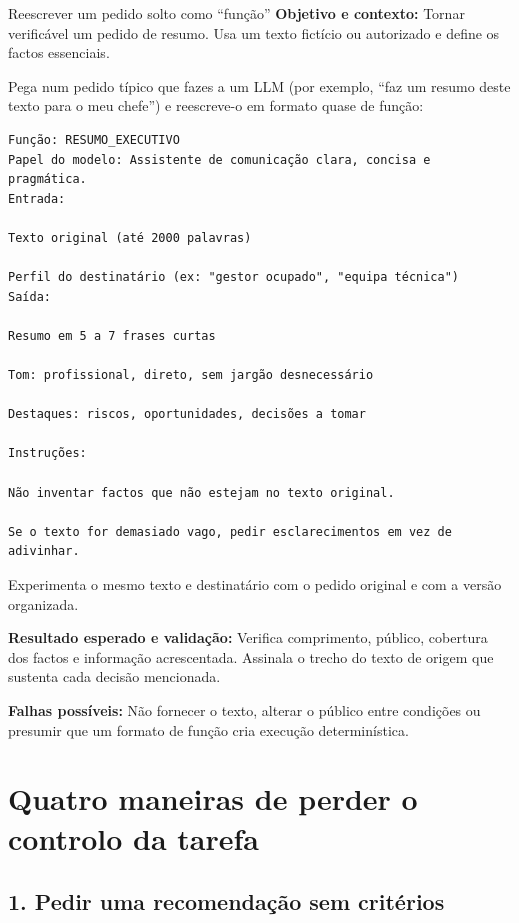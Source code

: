 \begin{promptlabbox}{Reescrever um pedido solto como “função”}
\textbf{Objetivo e contexto:} Tornar verificável um pedido de resumo. Usa um texto fictício ou autorizado e define os factos essenciais.

Pega num pedido típico que fazes a um LLM (por exemplo, “faz um resumo deste texto para o meu chefe”) e reescreve-o em formato quase de função:

\medskip

\begin{lstlisting}
Função: RESUMO_EXECUTIVO
Papel do modelo: Assistente de comunicação clara, concisa e pragmática.
Entrada:

Texto original (até 2000 palavras)

Perfil do destinatário (ex: "gestor ocupado", "equipa técnica")
Saída:

Resumo em 5 a 7 frases curtas

Tom: profissional, direto, sem jargão desnecessário

Destaques: riscos, oportunidades, decisões a tomar

Instruções:

Não inventar factos que não estejam no texto original.

Se o texto for demasiado vago, pedir esclarecimentos em vez de adivinhar.
\end{lstlisting}

Experimenta o mesmo texto e destinatário com o pedido original e com a versão organizada.

\textbf{Resultado esperado e validação:} Verifica comprimento, público, cobertura dos factos e informação acrescentada. Assinala o trecho do texto de origem que sustenta cada decisão mencionada.

\textbf{Falhas possíveis:} Não fornecer o texto, alterar o público entre condições ou presumir que um formato de função cria execução determinística.
\end{promptlabbox}

\section{Quatro maneiras de perder o controlo da tarefa}

\subsection*{1. Pedir uma recomendação sem critérios}

